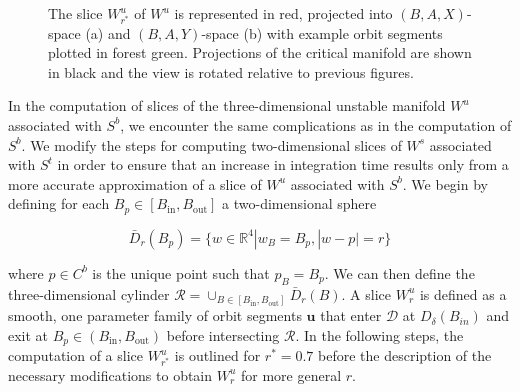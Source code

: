 \documentclass{ws-ijbc}
\begin{document}
\begin{figure}[ht]
\centering
{}
\caption{The slice $W^u_{r^*}$ of $W^u$ is represented in red, projected into $(B,A,X)$-space (a) and $(B,A,Y)$-space (b) with example orbit segments plotted in forest green.  Projections of the critical manifold are shown in black and the view is rotated relative to previous figures.}
\label{pieces}
\end{figure}

In the computation of slices of the three-dimensional unstable manifold $W^u$ associated with $S^b$, we encounter the same complications as in the computation of $S^b$.  We modify the steps for computing two-dimensional slices of $W^s$ associated with $S^t$ in order to ensure that an increase in integration time results only from a more accurate approximation of a slice of $W^u$ associated with $S^b$.  We begin by defining for each $B_p \in [B_{\mathrm{in}}, B_{\mathrm{out}}]$ a two-dimensional sphere

\begin{equation*}
\bar{D}_r(B_p)=\{w \in \mathbb{R}^4 | w_B = B_p, |w-p| = r\}
\end{equation*}

where $p \in C^b$ is the unique point such that $p_B = B_p$.  We can then define the three-dimensional cylinder $\mathscr{R} = \cup_{B \in [B_{\mathrm{in}}, B_{\mathrm{out}}]}\bar{D}_r(B)$.  A slice $W^u_r$ is defined as a smooth, one parameter family of orbit segments $\mathbf{u}$ that enter $\mathscr{D}$ at $D_\delta(B_{in})$ and exit at $B_p \in (B_{\mathrm{in}}, B_{\mathrm{out}})$ before intersecting $\mathscr{R}$.  In the following steps, the computation of a slice $W^u_{r^*}$ is outlined for $r^*=0.7$ before the description of the necessary modifications to obtain $W^u_r$ for more general $r$. 
\end{document}
